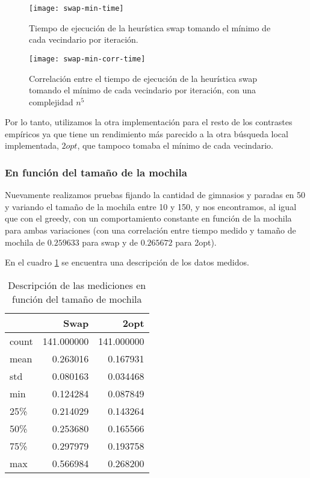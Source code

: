 \begin{figure}[H]
    \centering
    \texttt{[image: swap-min-time]}
    \caption{Tiempo de ejecución de la heurística swap tomando el mínimo de cada vecindario por iteración.}
    \label{fig:time-local-swap_min}
\end{figure}

\begin{figure}[H]
    \centering
    \texttt{[image: swap-min-corr-time]}
    \caption{Correlación entre el tiempo de ejecución de la heurística swap tomando el mínimo de cada vecindario por iteración, con una complejidad $n^5$}
    \label{fig:time-local-swap_min-correlation}
\end{figure}

Por lo tanto, utilizamos la otra implementación para el resto de los contrastes empíricos ya que tiene un rendimiento más parecido a la otra búsqueda local implementada, $2opt$, que tampoco tomaba el mínimo de cada vecindario.

\subsubsection{En función del tamaño de la mochila}

Nuevamente realizamos pruebas fijando la cantidad de gimnasios y paradas en 50 y variando el tamaño de la mochila entre 10 y 150, y nos encontramos, al igual que con el greedy, con un comportamiento constante en función de la mochila para ambas variaciones (con una correlación entre tiempo medido y tamaño de mochila de $0.259633$ para swap y de $0.265672$ para 2opt).

En el cuadro \ref{tab:time-local-moch} se encuentra una descripción de los datos medidos.

\begin{table}[H]
    \begin{center}
        \begin{tabular}{ l | r r }
            & Swap & 2opt \\
            \hline
            count  & 141.000000 & 141.000000 \\
            mean   &   0.263016 &   0.167931 \\
            std    &   0.080163 &   0.034468 \\
            min    &   0.124284 &   0.087849 \\
            25\%   &   0.214029 &   0.143264 \\
            50\%   &   0.253680 &   0.165566 \\
            75\%   &   0.297979 &   0.193758 \\
            max    &   0.566984 &   0.268200 \\
        \end{tabular}
        \caption{Descripción de las mediciones en función del tamaño de mochila}\label{tab:time-local-moch}
    \end{center}
\end{table}

